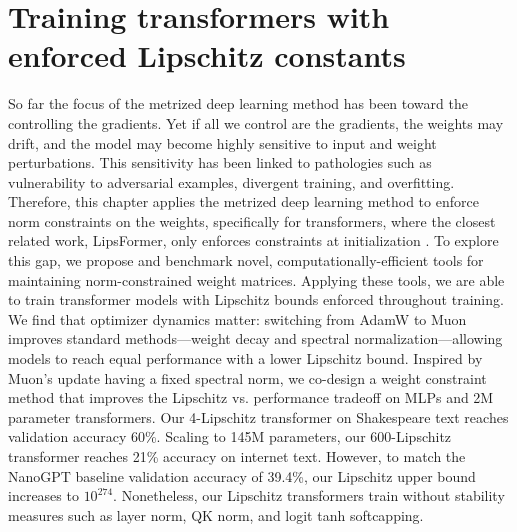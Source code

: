 \chapter{Training transformers with enforced Lipschitz constants}
\label{sec:weight-decay}


So far the focus of the metrized deep learning method has been toward the controlling the gradients. Yet if all we control are the gradients, the weights may drift, and the model may become highly sensitive to input and weight perturbations. This sensitivity has been linked to pathologies such as vulnerability to adversarial examples, divergent training, and overfitting. Therefore, this chapter applies the metrized deep learning method to enforce norm constraints on the weights, specifically for transformers, where the closest related work, LipsFormer, only enforces constraints at initialization \citep{qi2023lipsformer}. To explore this gap, we propose and benchmark novel, computationally-efficient tools for maintaining norm-constrained weight matrices. Applying these tools, we are able to train transformer models with Lipschitz bounds enforced throughout training. We find that optimizer dynamics matter: switching from AdamW to Muon improves standard methods---weight decay and spectral normalization---allowing models to reach equal performance with a lower Lipschitz bound. Inspired by Muon's update having a fixed spectral norm, we co-design a weight constraint method that improves the Lipschitz vs. performance tradeoff on MLPs and 2M parameter transformers. Our 4-Lipschitz transformer on Shakespeare text reaches validation accuracy 60\%. Scaling to 145M parameters, our 600-Lipschitz transformer reaches 21\% accuracy on internet text. However, to match the NanoGPT baseline validation accuracy of 39.4\%, our Lipschitz upper bound increases to $10^{274}$. Nonetheless, our Lipschitz transformers train without stability measures such as layer norm, QK norm, and logit tanh softcapping.

\vspace{1em}

